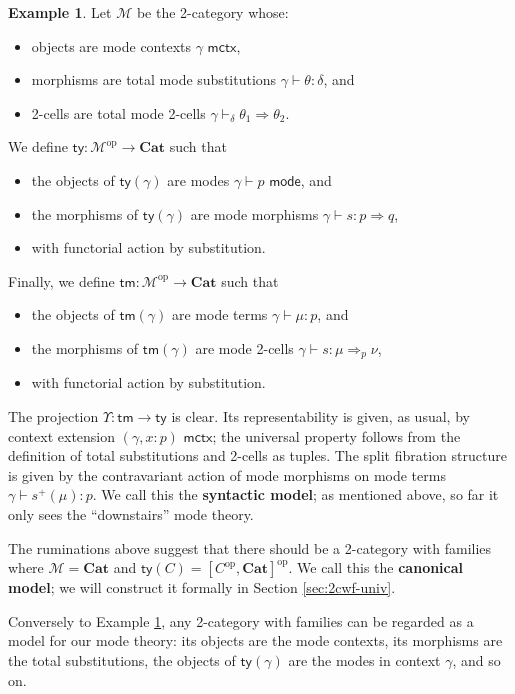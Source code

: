 \documentclass[10pt]{article}
\theoremstyle{definition}
\newtheorem{example}{Example}
\newcommand{\yields}{\vdash}
\newcommand{\tcell}{\Rightarrow}
\newcommand{\ctx}{\,\,\mathsf{mctx}}
\newcommand{\type}{\,\,\mathsf{mode}}
\newcommand\TypeTwo[4]{\ensuremath{#1 \vdash #2 :  #3 \tcell #4}}
\newcommand\TermTwoT[5]{\ensuremath{#1 \vdash {#2} : #3 \tcell_{#5} #4}}
\newcommand\TrPlus[2]{\ensuremath{{#1}^+(#2)}}
\newcommand\op{^{\mathrm{op}}}
\newcommand\Cat{\mathbf{Cat}}
\newcommand\M{\mathcal{M}}
\newcommand\Mty{\mathsf{ty}}
\newcommand\Mtm{\mathsf{tm}}
\newcommand\Ups{\Upsilon}
\begin{document}
\begin{example}\label{eg:syn-2cwf}
  Let $\M$ be the 2-category whose:
  \begin{itemize}
  \item objects are mode contexts $\gamma \ctx$,
  \item morphisms are total mode substitutions $\gamma \yields \theta : \delta$, and
  \item 2-cells are total mode 2-cells $\gamma \yields_\delta \theta_1 \tcell \theta_2$.
  \end{itemize}
  We define $\Mty:\M\op\to\Cat$ such that
  \begin{itemize}
  \item the objects of $\Mty(\gamma)$ are modes $\gamma \yields p\type$, and
  \item the morphisms of $\Mty(\gamma)$ are mode morphisms $\TypeTwo{\gamma}{s}{p}{q}$,
  \item with functorial action by substitution.
  \end{itemize}
  Finally, we define $\Mtm:\M\op\to\Cat$ such that
  \begin{itemize}
  \item the objects of $\Mtm(\gamma)$ are mode terms $\gamma \yields \mu:p$, and
  \item the morphisms of $\Mtm(\gamma)$ are mode 2-cells $\TermTwoT{\gamma}{s}{\mu}{\nu}{p}$,
  \item with functorial action by substitution.
  \end{itemize}
  The projection $\Ups:\Mtm\to\Mty$ is clear.
  Its representability is given, as usual, by context extension $(\gamma, x:p) \ctx$; the universal property follows from the definition of total substitutions and 2-cells as tuples.
  The split fibration structure is given by the contravariant action of mode morphisms on mode terms ${\gamma \yields \TrPlus{s}{\mu} : p}$.
  We call this the \textbf{syntactic model}; as mentioned above, so far it only sees the ``downstairs'' mode theory.
\end{example}

The ruminations above suggest that there should be a 2-category with families where $\M=\Cat$ and $\Mty(C) = [C\op,\Cat]\op$.
We call this the \textbf{canonical model}; we will construct it formally in Section \ref{sec:2cwf-univ}.

Conversely to Example \ref{eg:syn-2cwf}, any 2-category with families can be regarded as a model for our mode theory: its objects are the mode contexts, its morphisms are the total substitutions, the objects of $\Mty(\gamma)$ are the modes in context $\gamma$, and so on.
\end{document}
